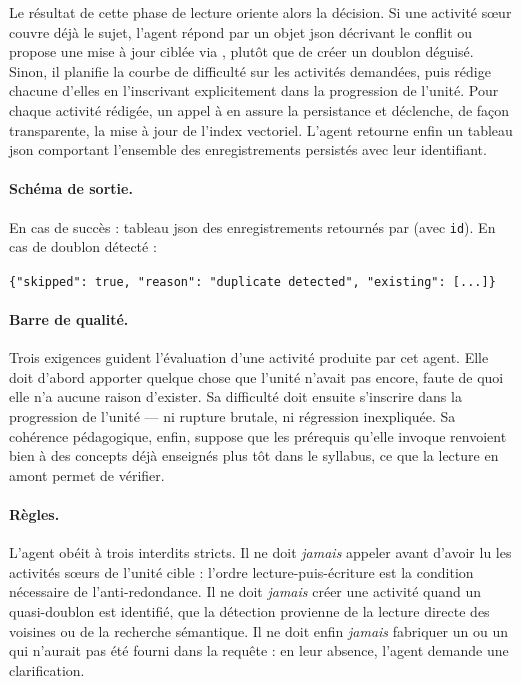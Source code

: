 Le résultat de cette phase de lecture oriente alors la décision. Si
une activité sœur couvre déjà le sujet, l'agent répond par un objet
\gls{json} décrivant le conflit ou propose une mise à jour ciblée
via , plutôt que de créer un doublon
déguisé. Sinon, il planifie la courbe de difficulté sur les
activités demandées, puis rédige chacune d'elles en l'inscrivant
explicitement dans la progression de l'unité. Pour chaque activité
rédigée, un appel à  en assure la
persistance et déclenche, de façon transparente, la mise à jour de
l'index vectoriel. L'agent retourne enfin un tableau \gls{json}
comportant l'ensemble des enregistrements persistés avec leur
identifiant.

\paragraph{Schéma de sortie.} En cas de succès : tableau \gls{json} des
enregistrements retournés par  (avec \texttt{id}).
En cas de doublon détecté :
\begin{center}
\texttt{\{"skipped": true,\,"reason": "duplicate detected",\,"existing": [...]\}}
\end{center}

\paragraph{Barre de qualité.} Trois exigences guident l'évaluation
d'une activité produite par cet agent. Elle doit d'abord apporter
quelque chose que l'unité n'avait pas encore, faute de quoi elle
n'a aucune raison d'exister. Sa difficulté doit ensuite s'inscrire
dans la progression de l'unité — ni rupture brutale, ni régression
inexpliquée. Sa cohérence pédagogique, enfin, suppose que les
prérequis qu'elle invoque renvoient bien à des concepts déjà
enseignés plus tôt dans le syllabus, ce que la lecture en amont
permet de vérifier.

\paragraph{Règles.} L'agent obéit à trois interdits stricts. Il ne
doit \emph{jamais} appeler  avant d'avoir
lu les activités sœurs de l'unité cible : l'ordre lecture-puis-écriture
est la condition nécessaire de l'anti-redondance. Il ne doit
\emph{jamais} créer une activité quand un quasi-doublon est
identifié, que la détection provienne de la lecture directe des
voisines ou de la recherche sémantique. Il ne doit enfin
\emph{jamais} fabriquer un  ou un
 qui n'aurait pas été fourni dans la requête :
en leur absence, l'agent demande une clarification.

